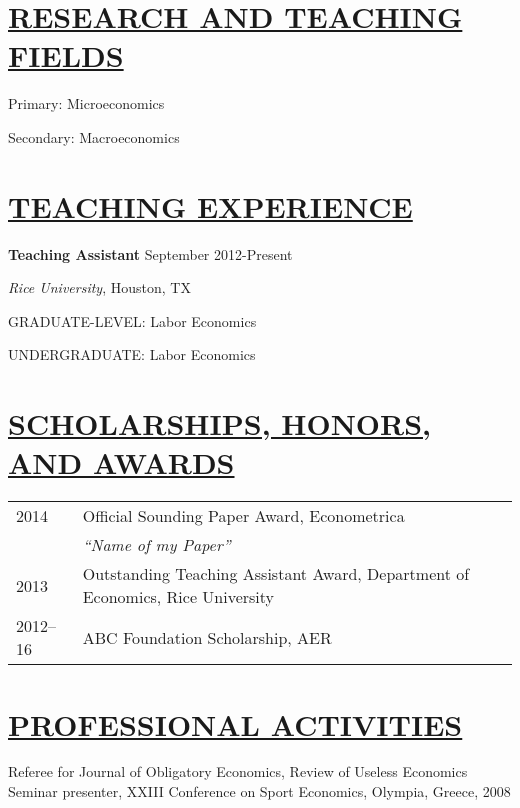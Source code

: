 \documentclass{res} %
\begin{document}
\begin{resume}
\vspace{-.2cm}
\section{\scshape \underline{RESEARCH AND TEACHING FIELDS}}
\vspace{6pt} 
\noindent Primary: Microeconomics \par
\noindent Secondary: Macroeconomics

\vspace{-.2cm}
\section{\scshape \underline{TEACHING EXPERIENCE}} 
\vspace{8pt}

\noindent \textbf{Teaching Assistant} \hfill     September 2012-Present \par
{\sl Rice University}, Houston, TX \par
GRADUATE-LEVEL: Labor Economics\par
UNDERGRADUATE: Labor Economics\par 

\vspace{-.2cm}
\section{\scshape \underline{SCHOLARSHIPS, HONORS, AND AWARDS}}
\vspace{6pt}
\noindent\begin{tabular}{l l}
 2014 & Official Sounding Paper Award, Econometrica \\
&\hspace{.5cm} \textsl{``Name of my Paper''} \\
 2013 & Outstanding Teaching Assistant Award, Department of Economics, Rice University \\
 2012--16 & ABC Foundation Scholarship, AER
\end{tabular}

\vspace{-.2cm}
\section{\scshape \underline{PROFESSIONAL ACTIVITIES}}
\vspace{6pt}
 \noindent Referee for Journal of Obligatory Economics, Review of Useless Economics \\
\noindent Seminar presenter, XXIII Conference on Sport Economics, Olympia, Greece, 2008 \


\end{resume}
\end{document}
